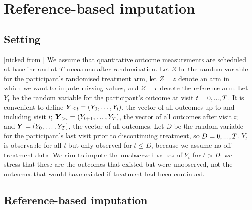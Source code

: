 \section{Reference-based imputation}

\subsection{Setting} [nicked from \citet{ian:RBIcausal}]
We assume that quantitative outcome measurements are scheduled at baseline and at $T$ occasions after randomisation. 
Let $Z$ be the random variable for the participant's randomised treatment arm, let $Z=z$ denote an arm in which we want to impute missing values, and $Z=r$ denote the reference arm.
Let $Y_t$ be the random variable for the participant's outcome at visit $t=0,...,T$. 
It is convenient to define 
$\boldsymbol{Y}_{{\le{t}}}=(Y_0,\ldots,Y_t)$, the vector of all outcomes up to  and including visit $t$; 
$\boldsymbol{Y}_{{>t}}=(Y_{t+1},\ldots,Y_T)$, the vector of all outcomes after visit $t$; 
and
$\boldsymbol{Y}=(Y_0,\ldots,Y_T)$, the vector of all outcomes.
Let $D$ be the random variable for the participant's last visit prior to discontinuing treatment, so $D=0,...,T$.
$Y_t$ is observable for all $t$ but only observed for $t \le D$, because we assume no off-treatment data. 
We aim to impute the unobserved values of $Y_t$ for $t>D$: we stress that these are the outcomes that existed but were unobserved, not the outcomes that would have existed if treatment had been continued.


\subsection{Reference-based imputation}

